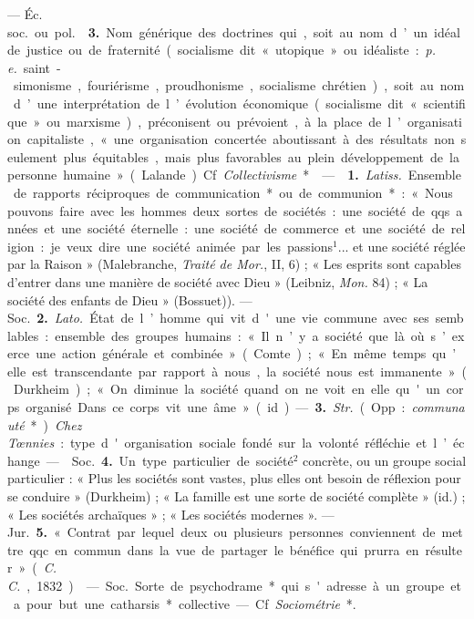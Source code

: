 \begin{itemize}[leftmargin=1cm, label=, itemsep=1pt]
— \si{Éc. soc.} ou \si{pol.}  {\bf 3.} Nom générique des
doctrines qui, soit au nom d’un idéal de justice ou de fraternité (socialisme
dit « utopique » ou idéaliste : {\it p. e.} saint-simonisme, fouriérisme,
proudhonisme, socialisme chrétien), soit au nom d’une interprétation de
l’évolution économique (socialisme dit « scientifique » ou marxisme),
préconisent ou prévoient, à la place de l’organisation capitaliste, « une
organisation concertée aboutissant à des résultats non seulement plus
équitables, mais plus favorables au plein développement de la personne
humaine » (Lalande). Cf. {\it Collectivisme}*.

 —  {\bf 1.} {\it Latiss.} Ensemble de rapports
réciproques de communication* ou de communion* : « Nous pouvons faire avec
les hommes deux sortes de sociétés : une société de qqs. années et une
société éternelle : une société de commerce et une société de religion : je
veux dire une société animée par les passions$^1$... et une société réglée
par la Raison » (Malebranche, {\it Traité de Mor.}, II, 6) ; « Les esprits
sont capables d'entrer dans une manière de société avec Dieu » (Leibniz,
{\it Mon.} 84) ; « La société des enfants de Dieu » (Bossuet)). — \si{Soc.}
{\bf 2.} {\it Lato.} État de l’homme qui vit d'une vie commune avec ses
semblables: ensemble des groupes humains : « Il n’y a société que là où
s’exerce une action générale et combinée » (Comte) ; « En même temps qu’elle
est transcendante par rapport à nous, la
société nous est immanente » (Durkheim) ; « On diminue la société quand on ne
voit en elle qu'un corps organisé... Dans ce corps vit une âme » (id.). —
{\bf 3.} {\it Str.} (Opp. : {\it communauté}*). {\it Chez Tœnnies} : type
d'organisation sociale fondé sur la volonté réfléchie et l’échange.

—  \si{Soc.} {\bf 4.} Un type particulier de société$^2$
concrète, ou un groupe social particulier : « Plus les sociétés sont vastes,
plus elles ont besoin de réflexion pour se conduire » (Durkheim) ; « La
famille est une sorte de société complète » (id.) ; « Les sociétés archaïques
» ; « Les sociétés modernes ». — \si{Jur.} {\bf 5.} « Contrat par lequel deux
ou plusieurs personnes conviennent de mettre qqc. en commun dans la vue de
partager le bénéfice qui prurra en résulter » ({\it C. C.}, 1832).

 — \si{Soc.} Sorte de psychodrame* qui s'adresse à un groupe
et a pour but une catharsis* collective. — Cf. {\it Sociométrie}*.


\end{itemize}

